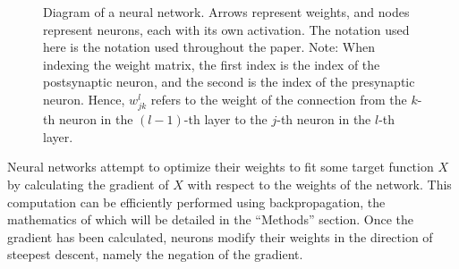 \documentclass[12pt]{article}
\begin{document}
\begin{figure}
	\centering
	\caption{Diagram of a neural network. Arrows represent weights, and nodes represent neurons, each with its own activation. The notation used here is the notation used throughout the paper. Note: When indexing the weight matrix, the first index is the index of the postsynaptic neuron, and the second is the index of the presynaptic neuron. Hence, $w^l_{jk}$ refers to the weight of the connection from the $k$-th neuron in the $(l-1)$-th layer to the $j$-th neuron in the $l$-th layer.}
\end{figure}

Neural networks attempt to optimize their weights to fit some target function $X$ by calculating the gradient of $X$ with respect to the weights of the network. This computation can be efficiently performed using backpropagation, the mathematics of which will be detailed in the ``Methods'' section. Once the gradient has been calculated, neurons modify their weights in the direction of steepest descent, namely the negation of the gradient.
\end{document}
